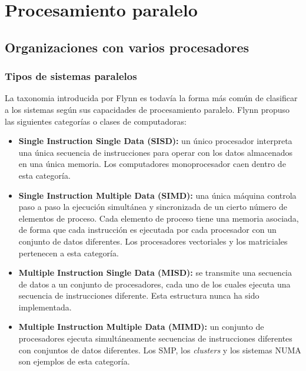 \section{Procesamiento paralelo}

\subsection{Organizaciones con varios procesadores}

\subsubsection*{Tipos de sistemas paralelos}

La taxonomia introducida por Flynn es todavía la forma más común de clasificar a los sistemas según sus capacidades de procesamiento paralelo. Flynn propuso las siguientes categorías o clases de computadoras:

\begin{itemize}
  \item \textbf{Single Instruction Single Data (SISD):} un único procesador interpreta una única secuencia de instrucciones para operar con los datos almacenados en una única memoria. Los computadores monoprocesador caen dentro de esta categoría.
  \item \textbf{Single Instruction Multiple Data (SIMD):} una única máquina controla paso a paso la ejecución simultánea y sincronizada de un cierto número de elementos de proceso. Cada elemento de proceso tiene una memoria asociada, de forma que cada instrucción es ejecutada por cada procesador con un conjunto de datos diferentes. Los procesadores vectoriales y los matriciales pertenecen a esta categoría.
  \item \textbf{Multiple Instruction Single Data (MISD):} se transmite una secuencia de datos a un conjunto de procesadores, cada uno de los cuales ejecuta una secuencia de instrucciones diferente. Esta estructura nunca ha sido implementada.
  \item \textbf{Multiple Instruction Multiple Data (MIMD):} un conjunto de procesadores ejecuta simultáneamente secuencias de instrucciones diferentes con conjuntos de datos diferentes. Los SMP, los \textit{clusters} y los sistemas NUMA son ejemplos de esta categoría.
\end{itemize}

